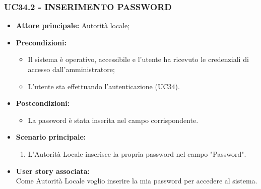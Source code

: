 \subsubsection{UC34.2 - INSERIMENTO PASSWORD}
\begin{itemize}
    \item \textbf{Attore principale:} Autorità locale;
    \item \textbf{Precondizioni:}
        \begin{itemize}
            \item Il sistema è operativo, accessibile e l’utente ha ricevuto le credenziali di accesso dall'amministratore;
            \item L’utente sta effettuando l’autenticazione (UC34).
        \end{itemize}
    \item \textbf{Postcondizioni:}
        \begin{itemize}
            \item La password è stata inserita nel campo corrispondente.
        \end{itemize}
    \item \textbf{Scenario principale:}
        \begin{enumerate}
            \item L'Autorità Locale inserisce la propria password nel campo "Password".
        \end{enumerate}
    \item \textbf{User story associata:} \\
    Come Autorità Locale voglio inserire la mia password per accedere al sistema.
\end{itemize}